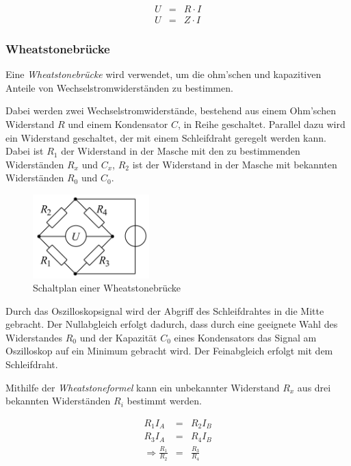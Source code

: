 \documentclass[12pt,a4paper]{scrartcl}
\numberwithin{equation}{section} %
\begin{document}
\begin{eqnarray}
    U &=& R\cdot I \\
    U &=& Z\cdot I
\end{eqnarray}

\hypertarget{wheatstonebruxfccke}{%
\subsubsection{Wheatstonebrücke}\label{wheatstonebruxfccke}}

Eine \emph{Wheatstonebrücke} wird verwendet, um die ohm'schen und kapazitiven Anteile von Wechselstromwiderständen zu bestimmen.

Dabei werden zwei Wechselstromwiderstände, bestehend aus einem Ohm'schen Widerstand $R$ und einem Kondensator $C$, in Reihe geschaltet. Parallel dazu wird ein Widerstand geschaltet, der mit einem Schleifdraht geregelt werden kann. Dabei ist $R_1$ der Widerstand in der Masche mit den zu bestimmenden Widerständen $R_x$ und $C_x$, $R_2$ ist der Widerstand in der Masche mit bekannten Widerständen $R_0$ und $C_0$.

\begin{figure}[h!]
	\centering
	\includegraphics[width=0.4\textwidth]{../media/B1.5/WhBr_Diagonalbild.png}
	\caption{Schaltplan einer Wheatstonebrücke \cite{File:WhBr_Diagonalbild}}
\end{figure}

Durch das Oszilloskopsignal wird der Abgriff des Schleifdrahtes in die Mitte gebracht. Der Nullabgleich erfolgt dadurch, dass durch eine geeignete Wahl des Widerstandes $R_0$ und der Kapazität $C_0$ eines Kondensators das Signal am Oszilloskop auf ein Minimum gebracht wird. Der Feinabgleich erfolgt mit dem Schleifdraht.

Mithilfe der \emph{Wheatstoneformel} kann ein unbekannter Widerstand $R_x$ aus drei bekannten Widerständen $R_i$ bestimmt werden.

\begin{eqnarray}
    R_1 I_A &=& R_2 I_B \\
    R_3 I_A &=& R_4 I_B \\
    \Rightarrow \frac{R_1}{R_2} &=& \frac{R_3}{R_4}
\end{eqnarray}
\end{document}
